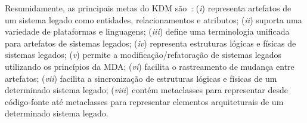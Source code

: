 Resumidamente, as principais metas do KDM são~\cite{ADM:OMG}: (\textit{i}) representa artefatos de um sistema legado como entidades, relacionamentos e atributos; (\textit{ii}) suporta uma variedade de plataformas e linguagens; (\textit{iii}) define uma terminologia unificada para artefatos de sistemas legados; (\textit{iv}) representa estruturas lógicas e físicas de sistemas legados; (\textit{v}) permite a modificação/refatoração de sistemas legados utilizando os princípios da MDA; (\textit{vi}) facilita o rastreamento de mudança entre artefatos; (\textit{vii}) facilita a sincronização de estruturas lógicas e físicas de um determinado sistema legado; (\textit{viii}) contém metaclasses para representar desde código-fonte até metaclasses para representar elementos arquiteturais de um determinado sistema legado.


